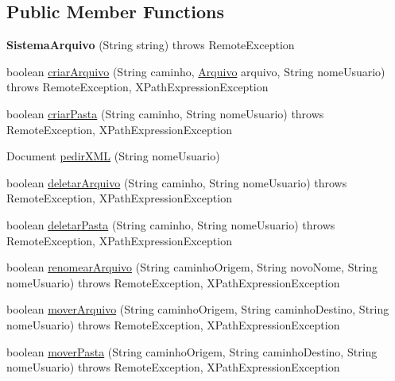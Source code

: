 \subsection*{Public Member Functions}
\begin{DoxyCompactItemize}
\item 
\hypertarget{classservidor_1_1_sistema_arquivo_a00a6f007cd7758829f5c3c83a0234c7a}{{\bfseries Sistema\+Arquivo} (String string)  throws Remote\+Exception }\label{classservidor_1_1_sistema_arquivo_a00a6f007cd7758829f5c3c83a0234c7a}

\item 
boolean \hyperlink{classservidor_1_1_sistema_arquivo_afa7146862daa7c0f38a1694d3073a7fe}{criar\+Arquivo} (String caminho, \hyperlink{classmodel_1_1_arquivo}{Arquivo} arquivo, String nome\+Usuario)  throws Remote\+Exception, X\+Path\+Expression\+Exception 
\item 
boolean \hyperlink{classservidor_1_1_sistema_arquivo_a54fff1b72f54a538c624c40f239d18f6}{criar\+Pasta} (String caminho, String nome\+Usuario)  throws Remote\+Exception, X\+Path\+Expression\+Exception 
\item 
Document \hyperlink{classservidor_1_1_sistema_arquivo_abcead514a91516e7db1b794afe5fdf14}{pedir\+X\+M\+L} (String nome\+Usuario)
\item 
boolean \hyperlink{classservidor_1_1_sistema_arquivo_a66be9b03399b2765ade1f5c2d39877a2}{deletar\+Arquivo} (String caminho, String nome\+Usuario)  throws Remote\+Exception, X\+Path\+Expression\+Exception 
\item 
boolean \hyperlink{classservidor_1_1_sistema_arquivo_a9ca48ba1937eca40566d38aadb888b12}{deletar\+Pasta} (String caminho, String nome\+Usuario)  throws Remote\+Exception, X\+Path\+Expression\+Exception 
\item 
boolean \hyperlink{classservidor_1_1_sistema_arquivo_ae0423e77b2ed7e597c8eeb292210631f}{renomear\+Arquivo} (String caminho\+Origem, String novo\+Nome, String nome\+Usuario)  throws Remote\+Exception, X\+Path\+Expression\+Exception 
\item 
boolean \hyperlink{classservidor_1_1_sistema_arquivo_a323b2d7c1e5c7c364029bb6557a6f444}{mover\+Arquivo} (String caminho\+Origem, String caminho\+Destino, String nome\+Usuario)  throws Remote\+Exception, X\+Path\+Expression\+Exception 
\item 
boolean \hyperlink{classservidor_1_1_sistema_arquivo_a52d97f440af51e6e7a8673627c9c99a1}{mover\+Pasta} (String caminho\+Origem, String caminho\+Destino, String nome\+Usuario)  throws Remote\+Exception, X\+Path\+Expression\+Exception 

\end{DoxyCompactItemize}
